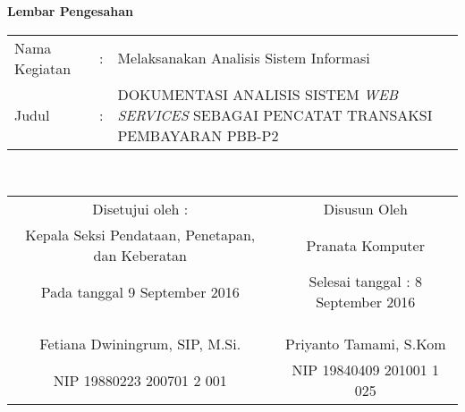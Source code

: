 \begin{center}
{\huge \bfseries Lembar Pengesahan}\\[0.4cm]

\begin{tabular}{l c p{10cm}}
  Nama Kegiatan & : & Melaksanakan Analisis Sistem Informasi \\
  Judul & : & DOKUMENTASI ANALISIS SISTEM \textit{WEB SERVICES} SEBAGAI PENCATAT TRANSAKSI PEMBAYARAN PBB-P2 \\
\end{tabular}\\[2cm]

\begin{tabular}{c c}
  Disetujui oleh : & Disusun Oleh \\
  Kepala Seksi Pendataan, Penetapan, dan Keberatan & Pranata Komputer \\
  Pada tanggal 9 September 2016 & Selesai tanggal : 8 September 2016 \\
  & \\
  & \\
  & \\
  Fetiana Dwiningrum, SIP, M.Si. & Priyanto Tamami, S.Kom \\
  NIP 19880223 200701 2 001 & NIP 19840409 201001 1 025
\end{tabular}

\end{center}